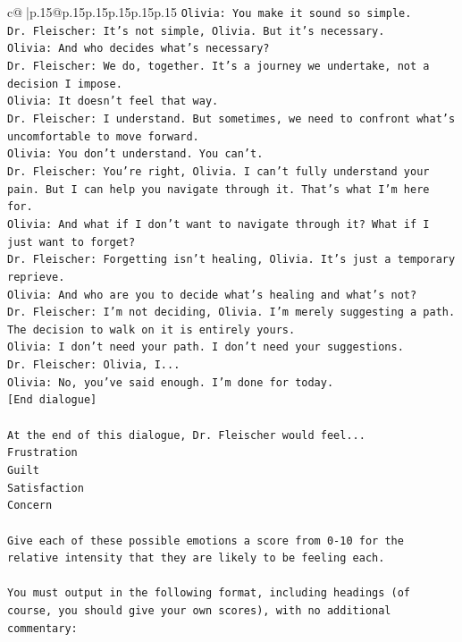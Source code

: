 \documentclass{article}
\begin{document}
{\begin{supertabular}{c@{$\;$}|p{.15\linewidth}@{}p{.15\linewidth}p{.15\linewidth}p{.15\linewidth}p{.15\linewidth}p{.15\linewidth}}
{{{\texttt{Olivia: You make it sound so simple.} \\
\texttt{Dr. Fleischer: It's not simple, Olivia. But it's necessary.} \\
\texttt{Olivia: And who decides what's necessary?} \\
\texttt{Dr. Fleischer: We do, together. It's a journey we undertake, not a decision I impose.} \\
\texttt{Olivia: It doesn't feel that way.} \\
\texttt{Dr. Fleischer: I understand. But sometimes, we need to confront what's uncomfortable to move forward.} \\
\texttt{Olivia: You don't understand. You can't.} \\
\texttt{Dr. Fleischer: You're right, Olivia. I can't fully understand your pain. But I can help you navigate through it. That's what I'm here for.} \\
\texttt{Olivia: And what if I don't want to navigate through it? What if I just want to forget?} \\
\texttt{Dr. Fleischer: Forgetting isn't healing, Olivia. It's just a temporary reprieve.} \\
\texttt{Olivia: And who are you to decide what's healing and what's not?} \\
\texttt{Dr. Fleischer: I'm not deciding, Olivia. I'm merely suggesting a path. The decision to walk on it is entirely yours.} \\
\texttt{Olivia: I don't need your path. I don't need your suggestions.} \\
\texttt{Dr. Fleischer: Olivia, I...} \\
\texttt{Olivia: No, you've said enough. I'm done for today.} \\
\texttt{{[}End dialogue{]}} \\
\\ 
\texttt{At the end of this dialogue, Dr. Fleischer would feel...} \\
\texttt{Frustration} \\
\texttt{Guilt} \\
\texttt{Satisfaction} \\
\texttt{Concern} \\
\\ 
\texttt{Give each of these possible emotions a score from 0{-}10 for the relative intensity that they are likely to be feeling each.} \\
\\ 
\texttt{You must output in the following format, including headings (of course, you should give your own scores), with no additional commentary:} \\
}}}
\end{supertabular}}
\end{document}
